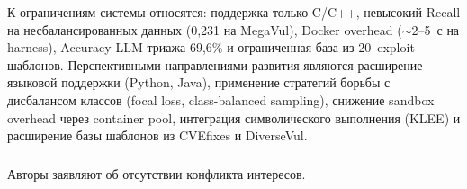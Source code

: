 \documentclass[runningheads]{llncs}
\begin{document}
К ограничениям системы относятся: поддержка только C/C++, невысокий Recall на несбалансированных данных (0,231 на MegaVul), Docker overhead (${\sim}2$--5~с на harness), Accuracy LLM-триажа 69,6\% и ограниченная база из 20~exploit-шаблонов. Перспективными направлениями развития являются расширение языковой поддержки (Python, Java), применение стратегий борьбы с дисбалансом классов (focal loss, class-balanced sampling), снижение sandbox overhead через container pool, интеграция символического выполнения (KLEE) и расширение базы шаблонов из CVEfixes и DiverseVul.


%
\begin{credits}
\subsubsection{\discintname}
Авторы заявляют об отсутствии конфликта интересов.
\end{credits}
%
%
\end{document}
